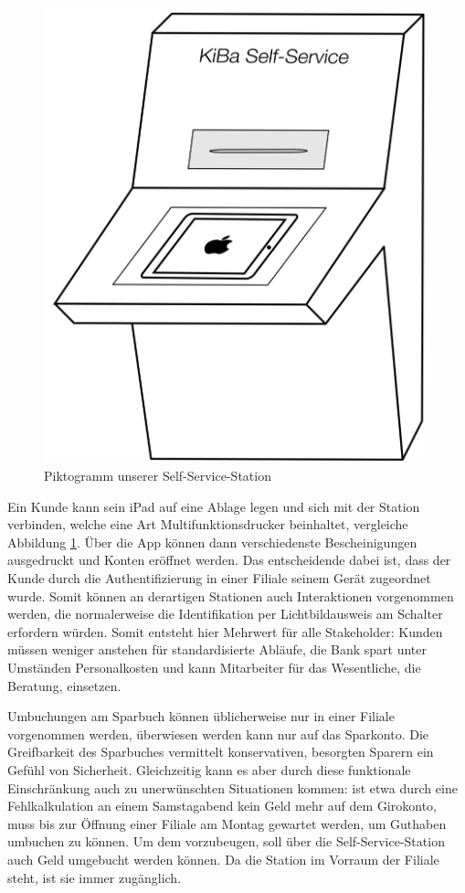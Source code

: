 \begin{figure}
	\centering
	\includegraphics[scale=0.2]{Pictures/SelfService}
	\caption{Piktogramm unserer Self-Service-Station\label{fig:SelfService}}
\end{figure}
	
	Ein Kunde kann sein iPad auf eine Ablage legen und sich mit der Station verbinden, welche eine Art Multifunktionsdrucker beinhaltet, vergleiche Abbildung \ref{fig:SelfService}. Über die App können dann verschiedenste Bescheinigungen ausgedruckt und Konten eröffnet werden. Das entscheidende dabei ist, dass der Kunde durch die Authentifizierung in einer Filiale seinem Gerät zugeordnet wurde. Somit können an derartigen Stationen auch Interaktionen vorgenommen werden, die normalerweise die Identifikation per Lichtbildausweis am Schalter erfordern würden. Somit entsteht hier Mehrwert für alle Stakeholder: Kunden müssen weniger anstehen für standardisierte Abläufe, die Bank spart unter Umständen Personalkosten und kann Mitarbeiter für das Wesentliche, die Beratung, einsetzen.

   Umbuchungen am Sparbuch können üblicherweise nur in einer Filiale vorgenommen werden, überwiesen werden kann nur auf das Sparkonto. Die Greifbarkeit des Sparbuches vermittelt konservativen, besorgten Sparern ein Gefühl von Sicherheit. Gleichzeitig kann es aber durch diese funktionale Einschränkung auch zu unerwünschten Situationen kommen: ist etwa durch eine Fehlkalkulation an einem Samstagabend kein Geld mehr auf dem Girokonto, muss bis zur Öffnung einer Filiale am Montag gewartet werden, um Guthaben umbuchen zu können. Um dem vorzubeugen, soll über die Self-Service-Station auch Geld umgebucht werden können. Da die Station im Vorraum der Filiale steht, ist sie immer zugänglich.   
    
